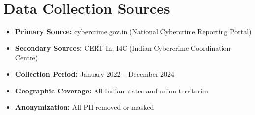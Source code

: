 \documentclass[10pt,a4paper]{article}
\begin{document}
\section{Data Collection Sources}

\begin{itemize}
\item \textbf{Primary Source:} cybercrime.gov.in (National Cybercrime Reporting Portal)
\item \textbf{Secondary Sources:} CERT-In, I4C (Indian Cybercrime Coordination Centre)
\item \textbf{Collection Period:} January 2022 -- December 2024
\item \textbf{Geographic Coverage:} All Indian states and union territories
\item \textbf{Anonymization:} All PII removed or masked
\end{itemize}
\end{document}
